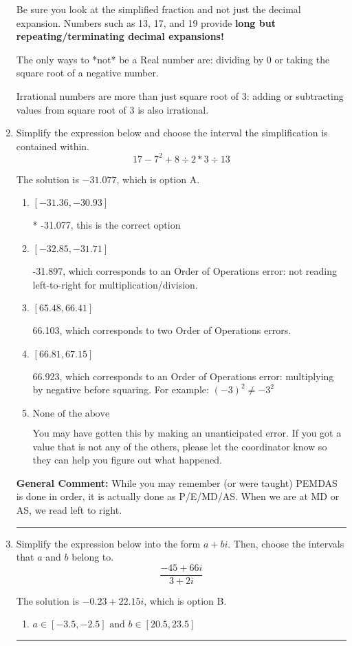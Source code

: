 \documentclass{extbook}[14pt]
\newcommand{\litem}[1]{\item #1

\rule{\textwidth}{0.4pt}}
\begin{document}
\begin{enumerate}
{ Be sure you look at the simplified fraction and not just the decimal expansion. Numbers such as 13, 17, and 19 provide \textbf{long but repeating/terminating decimal expansions!} 
 
 The only ways to *not* be a Real number are: dividing by 0 or taking the square root of a negative number. 
 
 Irrational numbers are more than just square root of 3: adding or subtracting values from square root of 3 is also irrational.
}
\litem{
Simplify the expression below and choose the interval the simplification is contained within.
\[ 17 - 7^2 + 8 \div 2 * 3 \div 13 \]

The solution is \( -31.077 \), which is option A.\begin{enumerate}[label=\Alph*.]
\item \( [-31.36, -30.93] \)

* -31.077, this is the correct option
\item \( [-32.85, -31.71] \)

 -31.897, which corresponds to an Order of Operations error: not reading left-to-right for multiplication/division.
\item \( [65.48, 66.41] \)

 66.103, which corresponds to two Order of Operations errors.
\item \( [66.81, 67.15] \)

 66.923, which corresponds to an Order of Operations error: multiplying by negative before squaring. For example: $(-3)^2 \neq -3^2$
\item \( \text{None of the above} \)

 You may have gotten this by making an unanticipated error. If you got a value that is not any of the others, please let the coordinator know so they can help you figure out what happened.
\end{enumerate}

\textbf{General Comment:} While you may remember (or were taught) PEMDAS is done in order, it is actually done as P/E/MD/AS. When we are at MD or AS, we read left to right.
}
\litem{
Simplify the expression below into the form $a+bi$. Then, choose the intervals that $a$ and $b$ belong to.
\[ \frac{-45 + 66 i}{3 + 2 i} \]

The solution is \( -0.23  + 22.15 i \), which is option B.\begin{enumerate}[label=\Alph*.]
\item \( a \in [-3.5, -2.5] \text{ and } b \in [20.5, 23.5] \)


\end{enumerate}}
\end{enumerate}
\end{document}
